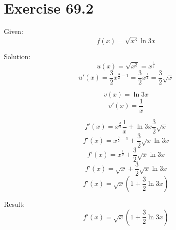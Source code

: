 \documentclass[a4paper, 10pt]{scrartcl}
\begin{document}
\section{Exercise 69.2}

Given:
\[f(x) = \sqrt{x^{3}}\ln{3x}\]

Solution:
\[u(x) = \sqrt{x^{3}} = x^{\frac{3}{2}}\]
\[u'(x) = \frac{3}{2}x^{\frac{3}{2} - 1} = \frac{3}{2}x^{\frac{1}{2}} =
          \frac{3}{2}\sqrt{x}\]


\[v(x) = \ln{3x}\]
\[v'(x) = \frac{1}{x}\]

\[f'(x) = x^{\frac{3}{2}}\frac{1}{x} + \ln{3x}\frac{3}{2}\sqrt{x}\]
\[f'(x) = x^{\frac{3}{2} - 1} + \frac{3}{2}\sqrt{x}\ln{3x}\]
\[f'(x) = x^{\frac{1}{2}} + \frac{3}{2}\sqrt{x}\ln{3x}\]
\[f'(x) = \sqrt{x} + \frac{3}{2}\sqrt{x}\ln{3x}\]
\[f'(x) = \sqrt{x}(1 + \frac{3}{2}\ln{3x})\]

Result:
\[f'(x) = \sqrt{x}(1 + \frac{3}{2}\ln{3x})\]
\end{document}
